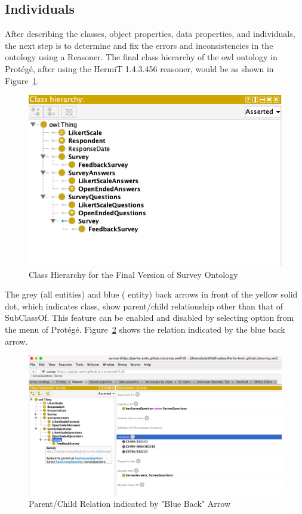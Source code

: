\begin{doublespace}
\subsection{Individuals}
\par 
\par After describing the classes, object properties, data properties, and individuals, the next step is to determine and fix the errors and inconsistencies in the ontology using a Reasoner. The final class hierarchy of the \ac{owl} ontology in Protégé, after using the HermiT 1.4.3.456 reasoner, would be as shown in Figure~\ref{fig:4.15}.
\begin{figure}[htp]
    \centering
    \includegraphics[width=15cm]{images/ch4/Figure15.png}
    \caption{Class Hierarchy for the Final Version of Survey Ontology}
    \label{fig:4.15}
\end{figure}
\par The grey (all entities) and blue ( entity) back arrows in front of the yellow solid dot, which indicates class, show parent/child relationship other than that of SubClassOf. This feature can be enabled and disabled by selecting  option from the  menu of Protégé. Figure~\ref{fig:4.16} shows the relation indicated by the blue back arrow.
\begin{figure}[htp]
    \centering
    \includegraphics[width=15cm]{images/ch4/Figure16.png}
    \caption{Parent/Child Relation indicated by "Blue Back" Arrow}
    \label{fig:4.16}
\end{figure}

\end{doublespace}
